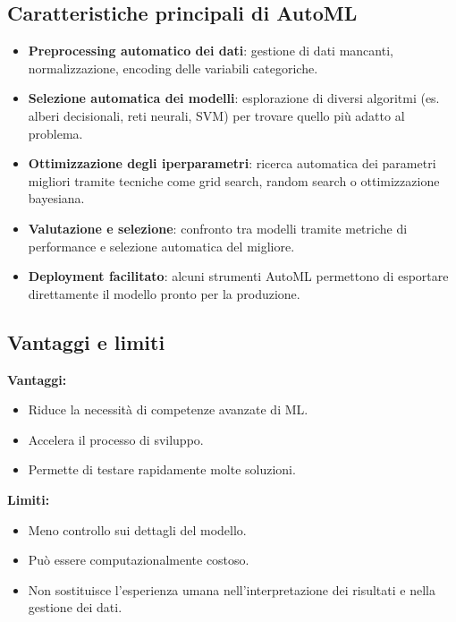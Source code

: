 \documentclass[a4paper,12pt]{article}
\begin{document}
\subsection{Caratteristiche principali di AutoML}
\begin{itemize}
    \item \textbf{Preprocessing automatico dei dati}: gestione di dati mancanti, normalizzazione, encoding delle variabili categoriche.
    \item \textbf{Selezione automatica dei modelli}: esplorazione di diversi algoritmi (es. alberi decisionali, reti neurali, SVM) per trovare quello più adatto al problema.
    \item \textbf{Ottimizzazione degli iperparametri}: ricerca automatica dei parametri migliori tramite tecniche come grid search, random search o ottimizzazione bayesiana.
    \item \textbf{Valutazione e selezione}: confronto tra modelli tramite metriche di performance e selezione automatica del migliore.
    \item \textbf{Deployment facilitato}: alcuni strumenti AutoML permettono di esportare direttamente il modello pronto per la produzione.
\end{itemize}

\subsection{Vantaggi e limiti}
\textbf{Vantaggi:}
\begin{itemize}
    \item Riduce la necessità di competenze avanzate di ML.
    \item Accelera il processo di sviluppo.
    \item Permette di testare rapidamente molte soluzioni.
\end{itemize}

\textbf{Limiti:}
\begin{itemize}
    \item Meno controllo sui dettagli del modello.
    \item Può essere computazionalmente costoso.
    \item Non sostituisce l'esperienza umana nell'interpretazione dei risultati e nella gestione dei dati.
\end{itemize}
\end{document}
